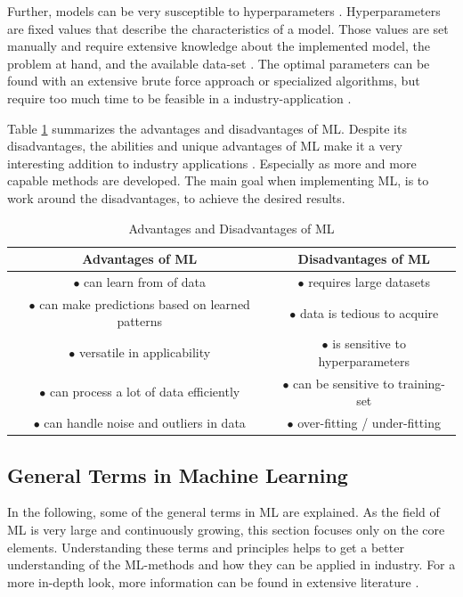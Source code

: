 Further, models can be very susceptible to hyperparameters \cite{Janiesch}. Hyperparameters are fixed values that describe the characteristics of a model. Those values are set manually and require extensive knowledge about the implemented model, the problem at hand, and the available data-set \cite{Luo}. The optimal parameters can be found with an extensive brute force approach or specialized algorithms, but require too much time to be feasible in a industry-application \cite{Claesen}. 

Table \ref{AdDis} summarizes the advantages and disadvantages of ML. Despite its disadvantages, the abilities and unique advantages of ML make it a very interesting addition to industry applications \cite{Bertolini}. Especially as more and more capable methods are developed. The main goal when implementing ML, is to work around the disadvantages, to achieve the desired results.


\begin{table}
	\begin{center}
	\begin{tabular}{|| c | c ||}
		\hline
		\rule{0pt}{2ex}
		 Advantages of ML & Disadvantages of ML \\
		\hline
				\rule{0pt}{2ex} 
		$\bullet$ can learn from of data & $\bullet$ requires large datasets \\
		$\bullet$ can make predictions based on learned patterns & $\bullet$ data is tedious to acquire\\	
		$\bullet$ versatile in applicability & $\bullet$ is sensitive to hyperparameters\\
		$\bullet$ can process a lot of data efficiently & $\bullet$ can be sensitive to training-set\\
		$\bullet$ can handle noise and outliers in data & $\bullet$ over-fitting / under-fitting\\
		\hline
	\end{tabular}
	\caption{Advantages and Disadvantages of ML}
	\label{AdDis}
\end{center}
\vspace{-4mm}
\end{table}

\subsection{General Terms in Machine Learning}
In the following, some of the general terms in ML are explained. As the field of ML is very large and continuously growing, this section focuses only on the core elements. Understanding these terms and principles helps to get a better understanding of the ML-methods and how they can be applied in industry. For a more in-depth look, more information can be found in extensive literature \cite{Theodoridis, Bishop, google}.

